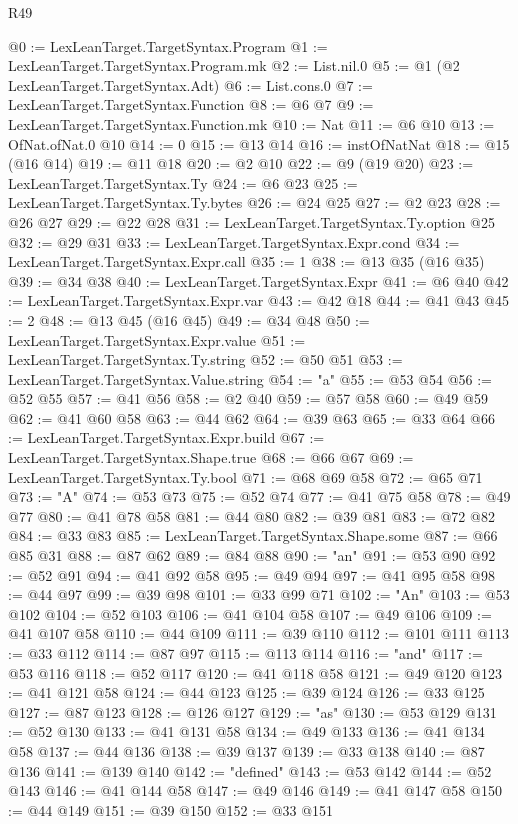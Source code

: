 \begin{lexlean}{R49}
\begin{coremodule}
@0 := LexLeanTarget.TargetSyntax.Program
@1 := LexLeanTarget.TargetSyntax.Program.mk
@2 := List.nil.{0}
@5 := @1 (@2 LexLeanTarget.TargetSyntax.Adt)
@6 := List.cons.{0}
@7 := LexLeanTarget.TargetSyntax.Function
@8 := @6 @7
@9 := LexLeanTarget.TargetSyntax.Function.mk
@10 := Nat
@11 := @6 @10
@13 := OfNat.ofNat.{0} @10
@14 := 0
@15 := @13 @14
@16 := instOfNatNat
@18 := @15 (@16 @14)
@19 := @11 @18
@20 := @2 @10
@22 := @9 (@19 @20)
@23 := LexLeanTarget.TargetSyntax.Ty
@24 := @6 @23
@25 := LexLeanTarget.TargetSyntax.Ty.bytes
@26 := @24 @25
@27 := @2 @23
@28 := @26 @27
@29 := @22 @28
@31 := LexLeanTarget.TargetSyntax.Ty.option @25
@32 := @29 @31
@33 := LexLeanTarget.TargetSyntax.Expr.cond
@34 := LexLeanTarget.TargetSyntax.Expr.call
@35 := 1
@38 := @13 @35 (@16 @35)
@39 := @34 @38
@40 := LexLeanTarget.TargetSyntax.Expr
@41 := @6 @40
@42 := LexLeanTarget.TargetSyntax.Expr.var
@43 := @42 @18
@44 := @41 @43
@45 := 2
@48 := @13 @45 (@16 @45)
@49 := @34 @48
@50 := LexLeanTarget.TargetSyntax.Expr.value
@51 := LexLeanTarget.TargetSyntax.Ty.string
@52 := @50 @51
@53 := LexLeanTarget.TargetSyntax.Value.string
@54 := "a"
@55 := @53 @54
@56 := @52 @55
@57 := @41 @56
@58 := @2 @40
@59 := @57 @58
@60 := @49 @59
@62 := @41 @60 @58
@63 := @44 @62
@64 := @39 @63
@65 := @33 @64
@66 := LexLeanTarget.TargetSyntax.Expr.build
@67 := LexLeanTarget.TargetSyntax.Shape.true
@68 := @66 @67
@69 := LexLeanTarget.TargetSyntax.Ty.bool
@71 := @68 @69 @58
@72 := @65 @71
@73 := "A"
@74 := @53 @73
@75 := @52 @74
@77 := @41 @75 @58
@78 := @49 @77
@80 := @41 @78 @58
@81 := @44 @80
@82 := @39 @81
@83 := @72 @82
@84 := @33 @83
@85 := LexLeanTarget.TargetSyntax.Shape.some
@87 := @66 @85 @31
@88 := @87 @62
@89 := @84 @88
@90 := "an"
@91 := @53 @90
@92 := @52 @91
@94 := @41 @92 @58
@95 := @49 @94
@97 := @41 @95 @58
@98 := @44 @97
@99 := @39 @98
@101 := @33 @99 @71
@102 := "An"
@103 := @53 @102
@104 := @52 @103
@106 := @41 @104 @58
@107 := @49 @106
@109 := @41 @107 @58
@110 := @44 @109
@111 := @39 @110
@112 := @101 @111
@113 := @33 @112
@114 := @87 @97
@115 := @113 @114
@116 := "and"
@117 := @53 @116
@118 := @52 @117
@120 := @41 @118 @58
@121 := @49 @120
@123 := @41 @121 @58
@124 := @44 @123
@125 := @39 @124
@126 := @33 @125
@127 := @87 @123
@128 := @126 @127
@129 := "as"
@130 := @53 @129
@131 := @52 @130
@133 := @41 @131 @58
@134 := @49 @133
@136 := @41 @134 @58
@137 := @44 @136
@138 := @39 @137
@139 := @33 @138
@140 := @87 @136
@141 := @139 @140
@142 := "defined"
@143 := @53 @142
@144 := @52 @143
@146 := @41 @144 @58
@147 := @49 @146
@149 := @41 @147 @58
@150 := @44 @149
@151 := @39 @150
@152 := @33 @151

\end{coremodule}
\end{lexlean}
